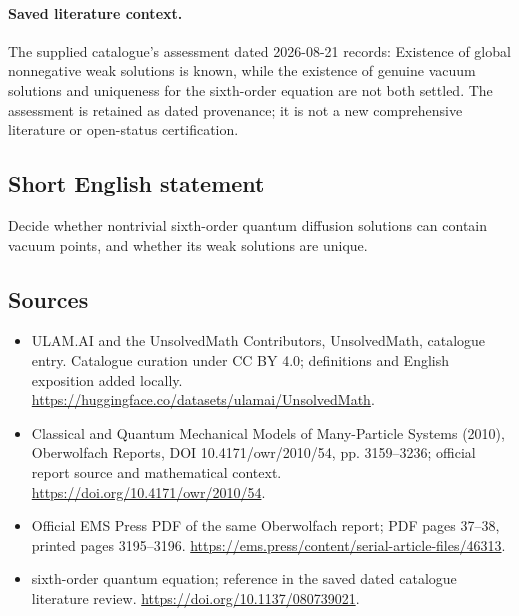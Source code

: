 \documentclass[11pt]{article}
\begin{document}
\paragraph{Saved literature context.} The supplied catalogue's assessment dated 2026-08-21 records: Existence of global nonnegative weak solutions is known, while the existence of genuine vacuum solutions and uniqueness for the sixth-order equation are not both settled. The assessment is retained as dated provenance; it is not a new comprehensive literature or open-status certification.
\subsection{Short English statement}
Decide whether nontrivial sixth-order quantum diffusion solutions can contain vacuum points, and whether its weak solutions are unique.
\subsection{Sources}
\begin{itemize}
\item[\hypertarget{source:statement:1}{S1}] ULAM.AI and the UnsolvedMath Contributors, UnsolvedMath, catalogue entry. Catalogue curation under CC BY 4.0; definitions and English exposition added locally.
\url{https://huggingface.co/datasets/ulamai/UnsolvedMath}.
\item[\hypertarget{source:statement:2}{S2}] Classical and Quantum Mechanical Models of Many-Particle Systems (2010), Oberwolfach Reports, DOI 10.4171/owr/2010/54, pp. 3159--3236; official report source and mathematical context.
\url{https://doi.org/10.4171/owr/2010/54}.
\item[\hypertarget{source:statement:3}{S3}] Official EMS Press PDF of the same Oberwolfach report; PDF pages 37--38, printed pages 3195--3196.
\url{https://ems.press/content/serial-article-files/46313}.
\item[\hypertarget{source:statement:4}{S4}] sixth-order quantum equation; reference in the saved dated catalogue literature review.
\url{https://doi.org/10.1137/080739021}.
\end{itemize}
\label{end:statement}
\end{document}
